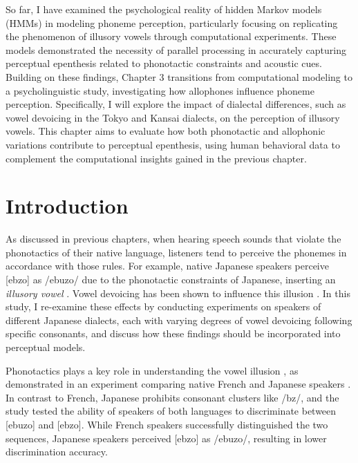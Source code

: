 So far, I have examined the psychological reality of hidden Markov models (HMMs) in modeling phoneme perception, particularly focusing on replicating the phenomenon of illusory vowels through computational experiments. These models demonstrated the necessity of parallel processing in accurately capturing perceptual epenthesis related to phonotactic constraints and acoustic cues. Building on these findings, Chapter 3 transitions from computational modeling to a psycholinguistic study, investigating how allophones influence phoneme perception. Specifically, I will explore the impact of dialectal differences, such as vowel devoicing in the Tokyo and Kansai dialects, on the perception of illusory vowels. This chapter aims to evaluate how both phonotactic and allophonic variations contribute to perceptual epenthesis, using human behavioral data to complement the computational insights gained in the previous chapter.

\section{Introduction}

As discussed in previous chapters, when hearing speech sounds that violate the phonotactics of their native language, listeners tend to perceive the phonemes in accordance with those rules. For example, native Japanese speakers perceive [ebzo] as /ebuzo/ due to the phonotactic constraints of Japanese, inserting an \textit{illusory vowel} \parencite{dupoux1999epentheticvi, dupoux2011illusory}. Vowel devoicing has been shown to influence this illusion \parencite{kilpatrick2018japanese}. In this study, I re-examine these effects by conducting experiments on speakers of different Japanese dialects, each with varying degrees of vowel devoicing following specific consonants, and discuss how these findings should be incorporated into perceptual models.

Phonotactics plays a key role in understanding the vowel illusion \parencite{halle2014special, monahan2009not, mattingley2015influence}, as demonstrated in an experiment comparing native French and Japanese speakers \parencite{dupoux1999epentheticvi}. In contrast to French, Japanese prohibits consonant clusters like /bz/, and the study tested the ability of speakers of both languages to discriminate between [ebuzo] and [ebzo]. While French speakers successfully distinguished the two sequences, Japanese speakers perceived [ebzo] as /ebuzo/, resulting in lower discrimination accuracy.

